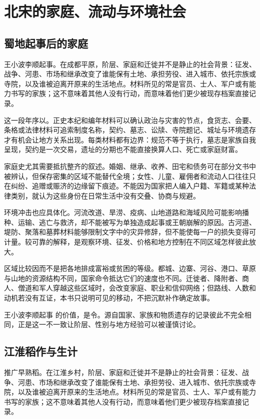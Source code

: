 \section{北宋的家庭、流动与环境社会}

\subsection{蜀地起事后的家庭}

王小波李顺起事。在成都平原，阶层、家庭和迁徙并不是静止的社会背景：征发、战争、河患、市场和继承改变了谁能保有土地、承担劳役、进入城市、依托宗族或寺院，以及谁被迫离开原来的生活地点。材料所见的常是官员、士人、军户或有能力书写的家族；这不意味着其他人没有行动，而意味着他们更少被现存档案直接记录。

这一段年序以。正史本纪和编年材料可以确认政治与灾害的节点，食货志、会要、条格或法律材料可追索制度名称，契约、墓志、讼牍、寺院题记、城址与环境遗存才有机会让地方关系出现。每类材料都有边界：规范不等于执行，墓志是家族自我呈现，契约是一次交易，遗址的分期也不能直接换算人口、死亡或家庭财富。

家庭史尤其需要抵抗整齐的叙述。婚姻、继承、收养、田宅和债务可在部分文书中被辨认，但保存密集的区域不能替代全境；女性、儿童、雇佣者和流动人口往往只在纠纷、追赠或赈济的边缘留下痕迹。不能因为国家把人编入户籍、军籍或某种法律类别，就认为这些身份在日常生活中没有交叠、协商与规避。

环境冲击也应具体化。河流改道、旱涝、疫病、山地道路和海域风险可能影响播种、运输、逃亡与救济，却不能被写为单独造成起事或王朝崩解的原因。古河道、堤防、聚落和墓葬材料能够限制文字中的灾异修辞，但不能使每一户的损失变得可计量。较可靠的解释，是观察环境、征发、价格和地方控制在不同区域怎样彼此放大。

区域比较因而不是把各地排成富裕或贫困的等级。都城、边寨、河谷、港口、草原与山地的资源结构不同，国家命令抵达它们的速度也不同。迁徙者、降附者、商人、僧道和军人穿越这些区域时，会改变家庭、职业和信仰网络；但路线、人数和动机若没有互证，本书只说明可见的移动，不把沉默补作确定故事。

王小波李顺起事 的价值，是令。源自国家、家族和物质遗存的记录彼此不完全相同，正是这一不一致让阶层、性别与地方经验可以被谨慎讨论。

\subsection{江淮稻作与生计}

推广早熟稻。在江淮乡村，阶层、家庭和迁徙并不是静止的社会背景：征发、战争、河患、市场和继承改变了谁能保有土地、承担劳役、进入城市、依托宗族或寺院，以及谁被迫离开原来的生活地点。材料所见的常是官员、士人、军户或有能力书写的家族；这不意味着其他人没有行动，而意味着他们更少被现存档案直接记录。

